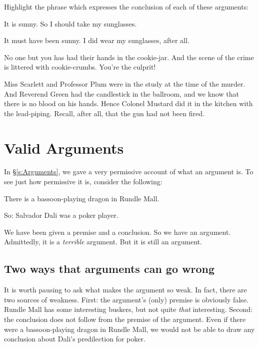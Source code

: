 \problempart 
Highlight the phrase which expresses the conclusion of each of these arguments:
\begin{earg}
	\item It is sunny. So I should take my sunglasses.
	\item It must have been sunny. I did wear my sunglasses, after all.
	\item No one but you has had their hands in the cookie-jar. And the scene of the crime is littered with cookie-crumbs. You're the culprit!
	\item Miss Scarlett and Professor Plum were in the study at the time of the murder. And Reverend Green had the candlestick in the ballroom, and we know that there is no blood on his hands. Hence Colonel Mustard did it in the kitchen with the lead-piping. Recall, after all, that the gun had not been fired.
\end{earg}


\chapter{Valid Arguments}\label{s:Valid}
In §\ref{s:Arguments}, we gave a very permissive account of what an argument is. To see just how permissive it is, consider the following:
	\begin{earg}
		\item[] There is a bassoon-playing dragon in Rundle Mall.
		\item[So:] Salvador Dali was a poker player.
	\end{earg}
We have been given a premise and a conclusion. So we have an argument. Admittedly, it is a \emph{terrible} argument. But it is still an argument.

\section{Two ways that arguments can go wrong}\label{s:twoways}

It is worth pausing to ask what makes the argument so weak. In fact, there are two sources of weakness. First: the argument's (only) premise is obviously false. Rundle Mall has some interesting buskers, but not quite \emph{that} interesting. Second: the conclusion does not follow from the premise of the argument. Even if there were a bassoon-playing dragon in Rundle Mall, we would not be able to draw any conclusion about Dali's predilection for poker.

